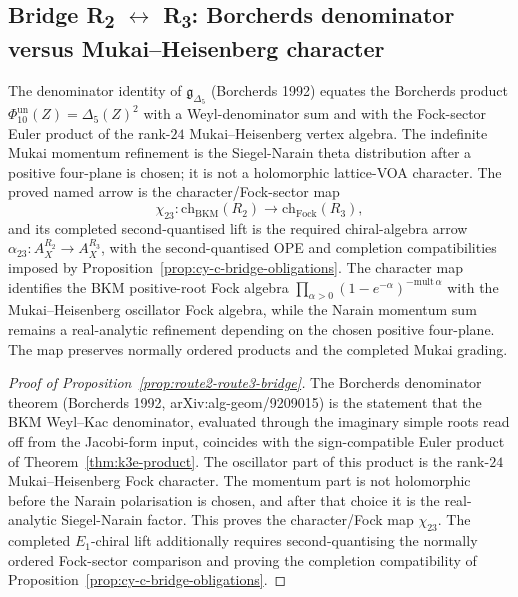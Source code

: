 \subsection{\texorpdfstring{Bridge R\textsubscript{2} $\leftrightarrow$ R\textsubscript{3}: Borcherds denominator versus Mukai--Heisenberg character}{Bridge R2 <-> R3: Borcherds denominator versus Mukai--Heisenberg character}}

\begin{proposition}
\label{prop:route2-route3-bridge}
The denominator identity of $\mathfrak{g}_{\Delta_5}$ (Borcherds 1992) equates the Borcherds product
\(\Phi_{10}^{\mathrm{un}}(Z)=\Delta_5(Z)^2\) with a Weyl-denominator sum
and with the Fock-sector Euler product of the rank-$24$ Mukai--Heisenberg
vertex algebra.  The indefinite Mukai momentum refinement is the
Siegel-Narain theta distribution after a positive four-plane is chosen;
it is not a holomorphic lattice-VOA character.  The proved named arrow
is the character/Fock-sector map
\[
 \chi_{23} \colon \mathrm{ch}_{\mathrm{BKM}}(R_2)
 \longrightarrow
 \mathrm{ch}_{\mathrm{Fock}}(R_3),
\]
and its completed second-quantised lift is the required
chiral-algebra arrow
\(\alpha_{23}\colon A_X^{R_2}\to A_X^{R_3}\), with the
second-quantised OPE and completion compatibilities imposed by
Proposition~\ref{prop:cy-c-bridge-obligations}. The character map
identifies the BKM
positive-root Fock algebra
\(\prod_{\alpha > 0} (1 - e^{-\alpha})^{-\mathrm{mult}\,\alpha}\) with
the Mukai--Heisenberg oscillator Fock algebra, while the Narain
momentum sum remains a real-analytic refinement depending on the chosen
positive four-plane.  The map preserves normally ordered products and
the completed Mukai grading.
\end{proposition}

\begin{proof}[Proof of Proposition~\ref{prop:route2-route3-bridge}]
The Borcherds denominator theorem (Borcherds 1992, arXiv:alg-geom/9209015) is the statement that the BKM Weyl--Kac denominator, evaluated through the imaginary simple roots read off from the Jacobi-form input, coincides with the sign-compatible Euler product of Theorem~\ref{thm:k3e-product}. The oscillator part of this product is the rank-$24$ Mukai--Heisenberg Fock character. The momentum part is not holomorphic before the Narain polarisation is chosen, and after that choice it is the real-analytic Siegel-Narain factor. This proves the character/Fock map \(\chi_{23}\). The completed \(E_1\)-chiral lift additionally requires second-quantising the normally ordered Fock-sector comparison and proving the completion compatibility of Proposition~\ref{prop:cy-c-bridge-obligations}.
\end{proof}

